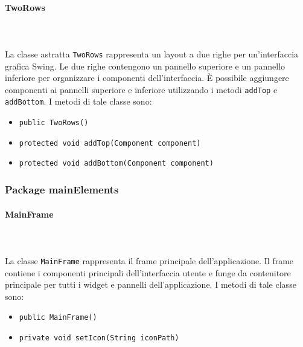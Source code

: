 \paragraph{TwoRows}\\
\\
La classe astratta \texttt{TwoRows} rappresenta un layout a due righe per un'interfaccia grafica Swing.
Le due righe contengono un pannello superiore e un pannello inferiore per organizzare i componenti dell'interfaccia.
È possibile aggiungere componenti ai pannelli superiore e inferiore utilizzando i metodi \texttt{addTop} e \texttt{addBottom}.
I metodi di tale classe sono:
\begin{itemize}
    \item \texttt{public TwoRows()}
    \item \texttt{protected void addTop(Component component)}
    \item \texttt{protected void addBottom(Component component)}
\end{itemize}

\subsubsection {Package mainElements}

\paragraph{MainFrame}\\
\\
La classe \texttt{MainFrame} rappresenta il frame principale dell'applicazione.
Il frame contiene i componenti principali dell'interfaccia utente e funge da contenitore principale per tutti i widget e pannelli dell'applicazione.
I metodi di tale classe sono:
\begin{itemize}
    \item \texttt{public MainFrame()}
    \item \texttt{private void setIcon(String iconPath)}
\end{itemize}

